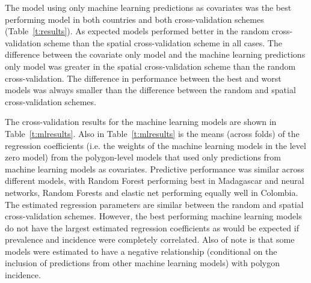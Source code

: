 \documentclass[11pt]{article}
\begin{document}
The model using only machine learning predictions as covariates was the best performing model in both countries and both cross-validation schemes (Table~\ref{t:results}).
As expected models performed better in the random cross-validation scheme than the spatial cross-validation scheme in all cases.
The difference between the covariate only model and the machine learning predictions only model was greater in the spatial cross-validation scheme than the random cross-validation.
The difference in performance between the best and worst models was always smaller than the difference between the random and spatial cross-validation schemes.

The cross-validation results for the machine learning models are shown in Table~\ref{t:mlresults}.
Also in Table~\ref{t:mlresults} is the means (across folds) of the  regression coefficients (i.e. the weights of the machine learning models in the level zero model) from the polygon-level models that used only predictions from machine learning models as covariates.
Predictive performance was similar across different models, with Random Forest performing best in Madagascar and neural networks, Random Forests and elastic net performing equally well in Colombia.
The estimated regression parameters are similar between the random and spatial cross-validation schemes.
However, the best performing machine learning models do not have the largest estimated regression coefficients as would be expected if prevalence and incidence were completely correlated.
Also of note is that some models were estimated to have a negative relationship (conditional on the inclusion of predictions from other machine learning models) with polygon incidence.

%
\end{document}
